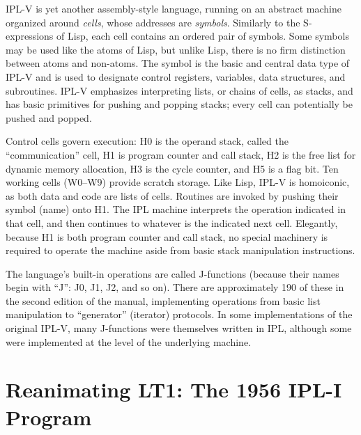 \documentclass[journal]{IEEEtran}
\begin{document}
IPL-V is yet another assembly-style language, running on an abstract machine
organized around \textit{cells}, whose addresses are \textit{symbols}.
Similarly to the S-expressions of Lisp, each cell contains an ordered pair of 
symbols.  Some symbols may be used like the atoms of Lisp, but unlike
Lisp, there is no firm distinction between atoms and non-atoms.
The symbol is the basic and central data type of IPL-V
and is used to designate control registers, variables, data structures,
and subroutines.
IPL-V emphasizes interpreting lists, or chains of cells,
as stacks, and has basic primitives for pushing and popping stacks;
every cell can potentially be pushed and popped.

Control cells
govern execution: H0 is the operand stack, called the
``communication'' cell, H1 is program counter and call
stack, H2 is the free list for dynamic memory allocation, H3 is
the cycle counter, and H5 is a flag bit. Ten working cells (W0--W9)
provide scratch storage. Like Lisp, IPL-V is homoiconic, as both
data and code are lists of cells. 
Routines
are invoked by pushing their symbol (name) onto H1. The IPL machine
interprets the operation indicated in that cell, and then continues to
whatever is the indicated next cell. Elegantly, because H1 is both
program counter and call stack, no special machinery is required to
operate the machine aside from basic stack manipulation instructions.

The language's built-in operations are called J-functions (because
their names begin with ``J'': J0, J1, J2, and so on). There are
approximately 190 of these in the second edition of the
manual, implementing operations from basic list
manipulation to ``generator'' (iterator) protocols. In some implementations
of the original
IPL-V, many J-functions were themselves written in IPL, although some
were implemented at the level of the underlying machine.

\section{Reanimating LT1: The 1956 IPL-I Program}
\label{sec:lt1}

\end{document}
